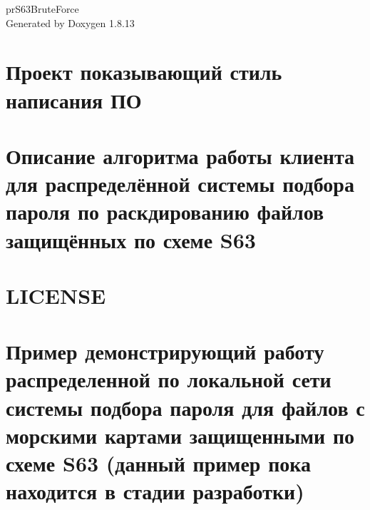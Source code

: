 \documentclass[twoside]{book}
\newcommand{\+}{\discretionary{\mbox{\scriptsize$\hookleftarrow$}}{}{}}
\newcommand{\clearemptydoublepage}{%
  \newpage{\pagestyle{empty}\cleardoublepage}%
}
\begin{document}
\hypersetup{pageanchor=false,
             bookmarksnumbered=true,
             pdfencoding=unicode
            }
\begin{titlepage}
\vspace*{7cm}
\begin{center}%
{\Large pr\+S63\+Brute\+Force }\\
\vspace*{1cm}
{\large Generated by Doxygen 1.8.13}\\
\end{center}
\end{titlepage}
\clearemptydoublepage
{}
\tableofcontents
\clearemptydoublepage
{}
\hypersetup{pageanchor=true}

\chapter{Проект показывающий стиль написания ПО}
\label{index}\hypertarget{index}{}
\chapter{Описание алгоритма работы клиента для распределённой системы подбора пароля по раскдированию файлов защищённых по схеме S63}
\label{md__home_antonov_work_project_pr_s63_brute_force_client_pr_s63_brute_force_client_readme}

\chapter{L\+I\+C\+E\+N\+SE}
\label{md__home_antonov_work_project_pr_s63_brute_force__l_i_c_e_n_s_e}

\chapter{Пример демонстрирующий работу распределенной по локальной сети системы подбора пароля для файлов с морскими картами защищенными по схеме S63 (данный пример пока находится в стадии разработки)}
\label{md__home_antonov_work_project_pr_s63_brute_force__r_e_a_d_m_e}

\end{document}
